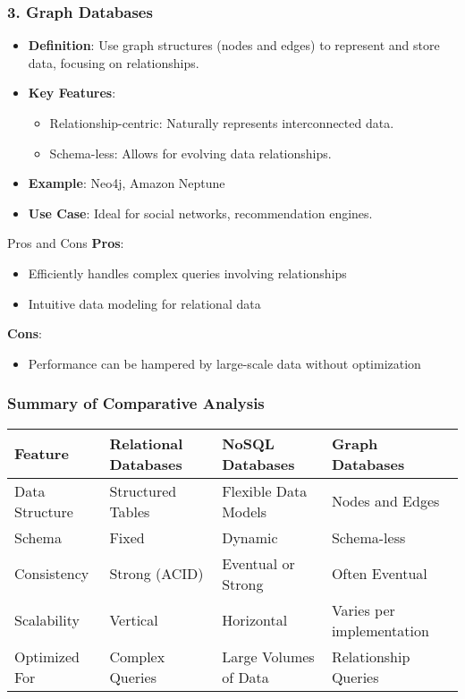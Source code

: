 \documentclass[aspectratio=169]{beamer}
\begin{document}
\begin{frame}[fragile]
    \frametitle{3. Graph Databases}
    \begin{itemize}
        \item \textbf{Definition}: Use graph structures (nodes and edges) to represent and store data, focusing on relationships.
        \item \textbf{Key Features}:
        \begin{itemize}
            \item Relationship-centric: Naturally represents interconnected data.
            \item Schema-less: Allows for evolving data relationships.
        \end{itemize}
        \item \textbf{Example}: Neo4j, Amazon Neptune
        \item \textbf{Use Case}: Ideal for social networks, recommendation engines.
    \end{itemize}
    
    \begin{block}{Pros and Cons}
        \textbf{Pros}:
        \begin{itemize}
            \item Efficiently handles complex queries involving relationships
            \item Intuitive data modeling for relational data
        \end{itemize}
        
        \textbf{Cons}:
        \begin{itemize}
            \item Performance can be hampered by large-scale data without optimization
        \end{itemize}
    \end{block}
\end{frame}

\begin{frame}[fragile]
    \frametitle{Summary of Comparative Analysis}
    \begin{table}[ht]
        \centering
        \begin{tabular}{|l|l|l|l|}
            \hline
            \textbf{Feature} & \textbf{Relational Databases} & \textbf{NoSQL Databases} & \textbf{Graph Databases} \\
            \hline
            Data Structure & Structured Tables & Flexible Data Models & Nodes and Edges \\
            \hline
            Schema & Fixed & Dynamic & Schema-less \\
            \hline
            Consistency & Strong (ACID) & Eventual or Strong & Often Eventual \\
            \hline
            Scalability & Vertical & Horizontal & Varies per implementation \\
            \hline
            Optimized For & Complex Queries & Large Volumes of Data & Relationship Queries \\
            \hline
        \end{tabular}
    \end{table}
\end{frame}
\end{document}

